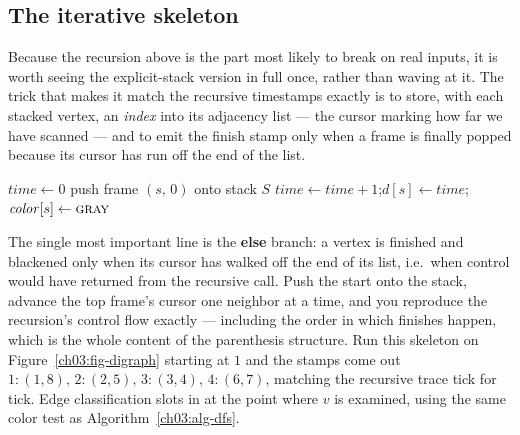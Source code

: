 \subsection{The iterative skeleton}
\label{ch03:iterative}

Because the recursion above is the part most likely to break on real inputs, it is worth seeing the explicit-stack version in full once, rather than waving at it. The trick that makes it match the recursive timestamps exactly is to store, with each stacked vertex, an \emph{index} into its adjacency list --- the cursor marking how far we have scanned --- and to emit the finish stamp only when a frame is finally popped because its cursor has run off the end of the list.

\begin{algorithm}[H]
\DontPrintSemicolon
{}
\BlankLine
$\mathit{time}\gets 0$\;
push frame $(s,\,0)$ onto stack $S$\;
$\mathit{time}\gets\mathit{time}+1$;\quad $d[s]\gets\mathit{time}$;\quad $\mathit{color}[s]\gets\textsc{gray}$\;
\caption{Iterative DFS with a per-frame adjacency cursor}
\label{ch03:alg-iterative}
\end{algorithm}

The single most important line is the \textbf{else} branch: a vertex is finished and blackened only when its cursor has walked off the end of its list, i.e.\ when control would have returned from the recursive call. Push the start onto the stack, advance the top frame's cursor one neighbor at a time, and you reproduce the recursion's control flow exactly --- including the order in which finishes happen, which is the whole content of the parenthesis structure. Run this skeleton on Figure~\ref{ch03:fig-digraph} starting at $1$ and the stamps come out $1{:}(1,8),\,2{:}(2,5),\,3{:}(3,4),\,4{:}(6,7)$, matching the recursive trace tick for tick. Edge classification slots in at the point where $v$ is examined, using the same color test as Algorithm~\ref{ch03:alg-dfs}.

